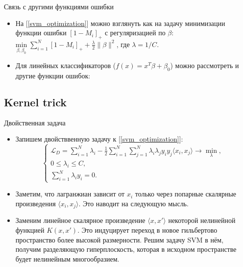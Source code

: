 \documentclass[9pt]{beamer}
\begin{document}
\begin{frame}{Связь с другими функциями ошибки}
    \begin{itemize}
        \item На [\ref{svm_optimization}] можно взглянуть как на задачу минимизации функции ошибки $[1-M_i]_+$ с регуляризацией по $\beta$: $\underset{\beta,\beta_0}{\mathrm{min}}\; \sum_{i=1}^N [1 - M_i]_+ + \frac{\lambda}{2}\|\beta\|^2$, где $\lambda=1/C$.
        \item Для линейных классификаторов ($f(x) = x^T\beta + \beta_0$) можно рассмотреть и другие функции ошибок:
    \end{itemize}
\end{frame}


\subsection{Kernel trick}

\begin{frame}{Двойственная задача}
\begin{itemize}
    \item Запишем двойстввенную задачу к [\ref{svm_optimization}]:
    $$
    \begin{cases}
        \mathcal{L}_D = \sum\limits_{i=1}^N\lambda_i - \frac{1}{2}\sum\limits_{i=1}^N\sum_{j=1}^N \lambda_i\lambda_jy_iy_j\langle x_i, x_j\rangle \rightarrow \min_{\lambda},\\
        0\leq \lambda_i \leq C,\\
        \sum\limits_{i=1}^N \lambda_i y_i = 0.
    \end{cases}
    $$
    \item Заметим, что лагранжиан зависит от $x_i$ только через попарные скалярные произведения $\langle x_i, x_j\rangle$. Это наводит на следующую мысль.
    \item Заменим линейное скалярное произведение $\langle x, x'\rangle$ некоторой нелинейной функцией $K(x, x')$. Это индуцирует переход в новое гильбертово пространство более высокой размерности. Решим задачу SVM в нём, получим разделяющую гиперплоскость, которая в исходном пространстве будет нелинейным многообразием. 
\end{itemize}
\end{frame}

\end{document}
